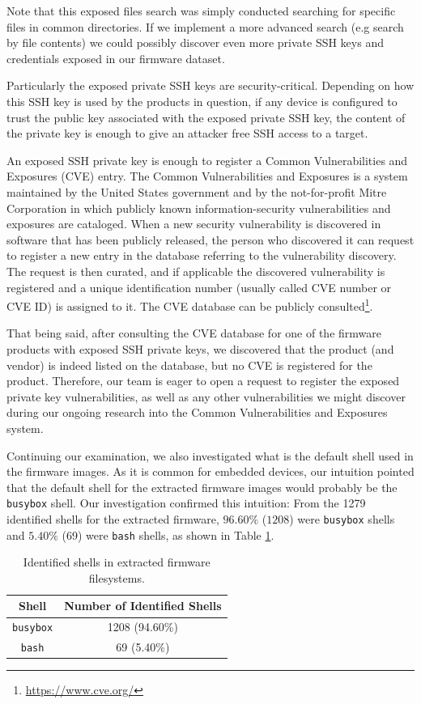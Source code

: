 Note that this exposed files search was simply conducted searching for specific files in common directories. If we implement a more advanced search (e.g search by file contents) we could possibly discover even more private SSH keys and credentials exposed in our firmware dataset.

Particularly the exposed private SSH keys are security-critical. Depending on how this SSH key is used by the products in question, if any device is configured to trust the public key associated with the exposed private SSH key, the content of the private key is enough to give an attacker free SSH access to a target.

An exposed SSH private key is enough to register a Common Vulnerabilities and Exposures (CVE) entry. The Common Vulnerabilities and Exposures is a system maintained by the United States government and by the not-for-profit Mitre Corporation in which publicly known information-security vulnerabilities and exposures are cataloged. When a new security vulnerability is discovered in software that has been publicly released, the person who discovered it can request to register a new entry in the database referring to the vulnerability discovery. The request is then curated, and if applicable the discovered vulnerability is registered and a unique identification number (usually called CVE number or CVE ID) is assigned to it. The CVE database can be publicly consulted\footnote{\url{https://www.cve.org/}}.

That being said, after consulting the CVE database for one of the firmware products with exposed SSH private keys, we discovered that the product (and vendor) is indeed listed on the database, but no CVE is registered for the product. Therefore, our team is eager to open a request to register the exposed private key vulnerabilities, as well as any other vulnerabilities we might discover during our ongoing research into the Common Vulnerabilities and Exposures system.

Continuing our examination, we also investigated what is the default shell used in the firmware images. As it is common for embedded devices, our intuition pointed that the default shell for the extracted firmware images would probably be the {\tt busybox} shell. Our investigation confirmed this intuition: From the 1279 identified shells for the extracted firmware, $96.60\%$ ($1208$) were {\tt busybox} shells and $5.40\%$ (69) were {\tt bash} shells, as shown in Table \ref{tab:shell-count}.

\begin{table}[H]
\centering
\caption{Identified shells in extracted firmware filesystems.}
\begin{tabular}{|c|c|}
\hline
\textbf{Shell} & \textbf{Number of Identified Shells} \\ \hline
{\tt busybox}        & 1208 (94.60\%)              \\
{\tt bash}           & 69 (5.40\%)                 \\ \hline
\end{tabular}
\label{tab:shell-count}
\end{table}

